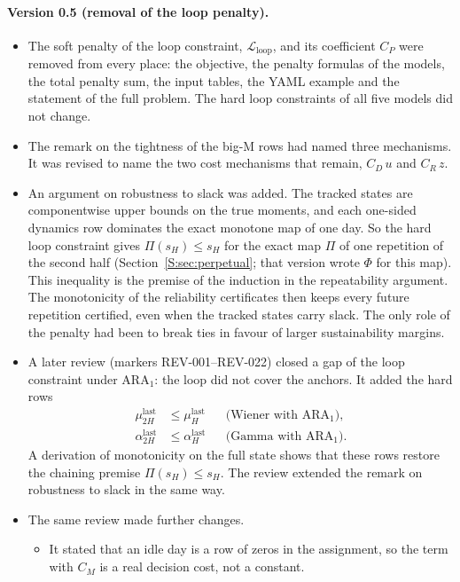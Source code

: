 \documentclass[11pt,a4paper]{article}
\theoremstyle{plain}
\theoremstyle{definition}
\theoremstyle{remark}
\begin{document}
\paragraph{Version 0.5 (removal of the loop penalty).}
\begin{itemize}
  \item The soft penalty of the loop constraint, $\mathcal{L}_{\mathrm{loop}}$, and its coefficient $C_P$ were removed from every place: the objective, the penalty formulas of the models, the total penalty sum, the input tables, the YAML example and the statement of the full problem.
    The hard loop constraints of all five models did not change.
  \item The remark on the tightness of the big-M rows had named three mechanisms.
    It was revised to name the two cost mechanisms that remain, $C_D\,u$ and $C_R\,z$.
  \item An argument on robustness to slack was added.
    The tracked states are componentwise upper bounds on the true moments, and each one-sided dynamics row dominates the exact monotone map of one day.
    So the hard loop constraint gives $\Pi(s_H) \le s_H$ for the exact map $\Pi$ of one repetition of the second half (Section~\ref{S:sec:perpetual}; that version wrote $\Phi$ for this map).
    This inequality is the premise of the induction in the repeatability argument.
    The monotonicity of the reliability certificates then keeps every future repetition certified, even when the tracked states carry slack.
    The only role of the penalty had been to break ties in favour of larger sustainability margins.
  \item A later review (markers REV-001--REV-022) closed a gap of the loop constraint under $\text{ARA}_1$: the loop did not cover the anchors.
    It added the hard rows
    \begin{align}
      \mu^{\mathrm{last}}_{2H} &\le \mu^{\mathrm{last}}_{H} && \text{(Wiener with $\text{ARA}_1$)}, \\
      \alpha^{\mathrm{last}}_{2H} &\le \alpha^{\mathrm{last}}_{H} && \text{(Gamma with $\text{ARA}_1$)}.
    \end{align}
    A derivation of monotonicity on the full state shows that these rows restore the chaining premise $\Pi(s_H) \le s_H$.
    The review extended the remark on robustness to slack in the same way.
  \item The same review made further changes.
    \begin{itemize}
      \item It stated that an idle day is a row of zeros in the assignment, so the term with $C_M$ is a real decision cost, not a constant.

\end{itemize}
\end{itemize}
\end{document}
